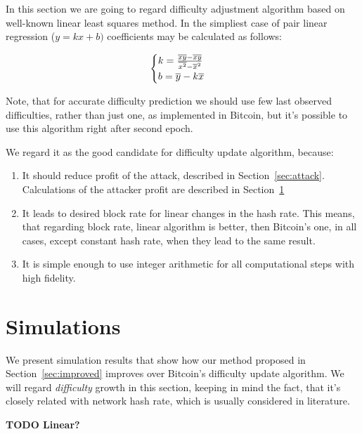 \documentclass[]{llncs}
\begin{document}
In this section we are going to regard difficulty adjustment algorithm based on well-known linear least squares method\cite{lawson1974solving}. In the simpliest case of pair linear regression (\(y=kx+b)\) coefficients may be calculated as follows:

\begin{equation}
  \begin{cases}
    k= {{\overline{xy} - \overline{x}\overline{y}} \over {\overline{x^2} - \overline{x}^2}}  \\
    b= \overline{y}-k\overline{x}
  \end{cases}
\end{equation}

Note, that for accurate difficulty prediction we should use few last observed difficulties, rather than just one, as implemented in Bitcoin, but it's possible to use this algorithm right after second epoch.


We regard it as the good candidate for difficulty update algorithm, because:
\begin{enumerate}
\item{It should reduce profit of the attack, described in Section~\ref{sec:attack}. Calculations of the attacker profit are described in Section~\ref{sec:sim}}
\item{It leads to desired block rate for linear changes in the hash rate.
This means, that regarding block rate, linear algorithm is better, then Bitcoin's one, in all cases, except constant hash rate, when they lead to the same result. }
\item{It is simple enough to use integer arithmetic for all computational steps with high fidelity.}
\end{enumerate}

\section{Simulations}
\label{sec:sim}

We present simulation results that show how our method proposed in Section~\ref{sec:improved} improves over Bitcoin’s difficulty update algorithm.
We will regard \textit{difficulty} growth in this section, keeping in mind the fact, that it's closely related with network hash rate, which is usually considered in literature.


\textbf{TODO Linear?}
\end{document}
